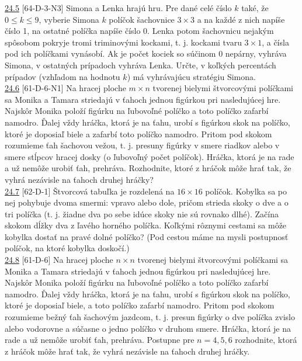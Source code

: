 \noindent \ul{24.5} [64-D-3-N3] Simona a Lenka hrajú hru. Pre dané celé číslo $k$ také, že $0 \leq k \leq 9$, vyberie Simona $k$ políčok šachovnice $3 \times 3$ a na každé z nich napíše číslo 1, na ostatné políčka napíše číslo 0. Lenka potom šachovnicu nejakým spôsobom pokryje tromi triminovými kockami, t. j. kockami tvaru $3\times1$, a čísla pod ich políčkami vynásobí. Ak je počet kociek so súčinom 0 nepárny, vyhráva Simona, v ostatných prípadoch vyhráva Lenka. Určte, v koľkých percentách prípadov (vzhľadom na hodnotu $k$) má vyhrávajúcu stratégiu Simona.\\

\noindent \ul{24.6} [61-D-6-N1] Na hracej ploche $m\times n$ tvorenej bielymi štvorcovými políčkami sa Monika a Tamara striedajú v ťahoch jednou figúrkou pri nasledujúcej hre. Najskôr Monika položí figúrku na ľubovoľné políčko a toto políčko zafarbí namodro. Ďalej vždy hráčka, ktorá je na ťahu, urobí s figúrkou skok na políčko, ktoré je doposiaľ biele a zafarbí toto políčko namodro. Pritom pod skokom rozumieme ťah šachovou vežou, t. j. presuny figúrky v smere riadkov alebo v smere stĺpcov hracej dosky (o ľubovoľný počet políčok). Hráčka, ktorá je na rade a už nemôže urobiť ťah, prehráva. Rozhodnite, ktoré z hráčok môže hrať tak, že vyhrá nezávisle na ťahoch druhej hráčky?\\

\noindent \ul{24.7} [62-D-1]
Štvorcová tabuľka je rozdelená na $16\times16$ políčok. Kobylka sa po nej pohybuje dvoma smermi: vpravo alebo dole, pričom strieda skoky o dve a o tri políčka (t. j. žiadne dva po sebe idúce skoky nie sú rovnako dlhé). Začína skokom dĺžky dva z ľavého horného políčka. Koľkými rôznymi cestami sa môže kobylka dostať na pravé dolné políčko? (Pod cestou máme na mysli postupnosť políčok, na ktoré kobylka doskočí.)\\

\noindent \ul{24.8} [61-D-6]
Na hracej ploche $n \times n$ tvorenej bielymi štvorcovými políčkami sa Monika a Tamara striedajú v ťahoch jednou figúrkou pri nasledujúcej hre. Najskôr Monika položí figúrku na ľubovoľné políčko a toto políčko zafarbí namodro. Ďalej vždy hráčka, ktorá je na ťahu, urobí s figúrkou skok na políčko, ktoré je doposiaľ biele, a toto políčko zafarbí namodro. Pritom pod skokom rozumieme bežný ťah šachovým jazdcom, t. j. presun figúrky o dve políčka zvislo alebo vodorovne a súčasne o jedno políčko v druhom smere. Hráčka, ktorá je na rade a už nemôže urobiť ťah, prehráva. Postupne pre $n = 4, 5, 6$ rozhodnite, ktorá z hráčok môže hrať tak, že vyhrá nezávisle na ťahoch druhej hráčky.\\

